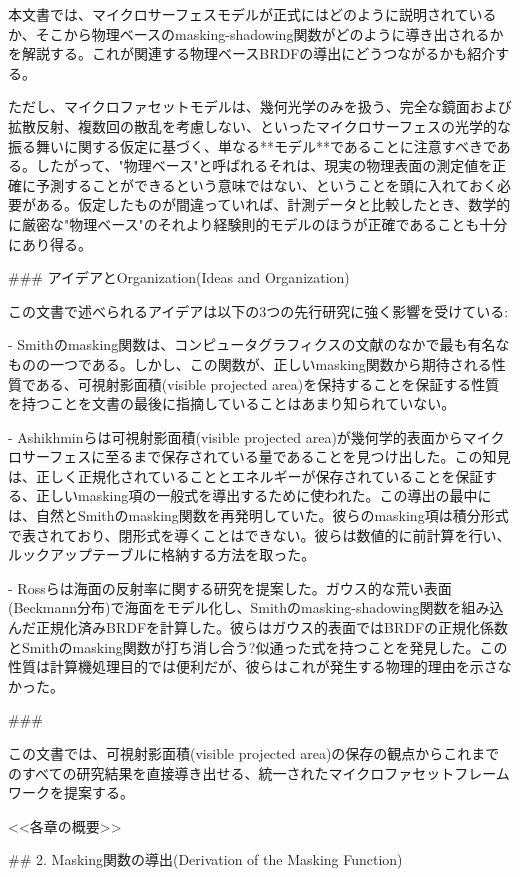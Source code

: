 本文書では、マイクロサーフェスモデルが正式にはどのように説明されているか、そこから物理ベースのmasking-shadowing関数がどのように導き出されるかを解説する。これが関連する物理ベースBRDFの導出にどうつながるかも紹介する。

ただし、マイクロファセットモデルは、幾何光学のみを扱う、完全な鏡面および拡散反射、複数回の散乱を考慮しない、といったマイクロサーフェスの光学的な振る舞いに関する仮定に基づく、単なる**モデル**であることに注意すべきである。したがって、"物理ベース"と呼ばれるそれは、現実の物理表面の測定値を正確に予測することができるという意味ではない、ということを頭に入れておく必要がある。仮定したものが間違っていれば、計測データと比較したとき、数学的に厳密な"物理ベース"のそれより経験則的モデルのほうが正確であることも十分にあり得る。

### アイデアとOrganization(Ideas and Organization)

この文書で述べられるアイデアは以下の3つの先行研究に強く影響を受けている:

- Smithのmasking関数は、コンピュータグラフィクスの文献のなかで最も有名なものの一つである。しかし、この関数が、正しいmasking関数から期待される性質である、可視射影面積(visible projected area)を保持することを保証する性質を持つことを文書の最後に指摘していることはあまり知られていない。

- Ashikhminらは可視射影面積(visible projected area)が幾何学的表面からマイクロサーフェスに至るまで保存されている量であることを見つけ出した。この知見は、正しく正規化されていることとエネルギーが保存されていることを保証する、正しいmasking項の一般式を導出するために使われた。この導出の最中には、自然とSmithのmasking関数を再発明していた。彼らのmasking項は積分形式で表されており、閉形式を導くことはできない。彼らは数値的に前計算を行い、ルックアップテーブルに格納する方法を取った。

- Rossらは海面の反射率に関する研究を提案した。ガウス的な荒い表面(Beckmann分布)で海面をモデル化し、Smithのmasking-shadowing関数を組み込んだ正規化済みBRDFを計算した。彼らはガウス的表面ではBRDFの正規化係数とSmithのmasking関数が打ち消し合う?似通った式を持つことを発見した。この性質は計算機処理目的では便利だが、彼らはこれが発生する物理的理由を示さなかった。

###

この文書では、可視射影面積(visible projected area)の保存の観点からこれまでのすべての研究結果を直接導き出せる、統一されたマイクロファセットフレームワークを提案する。

<<各章の概要>>

## 2. Masking関数の導出(Derivation of the Masking Function)

